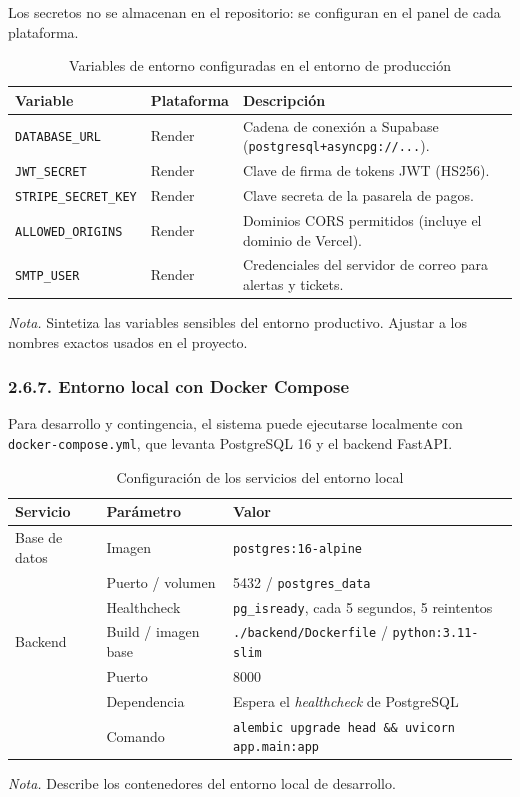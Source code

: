Los secretos no se almacenan en el repositorio: se configuran en el panel de cada plataforma.

\begin{table}[htbp]
\caption{Variables de entorno configuradas en el entorno de producción}
\label{tab:env_produccion}
\begin{tabular}{@{}p{5cm} p{2cm} p{8cm}@{}}
\toprule
\textbf{Variable} & \textbf{Plataforma} & \textbf{Descripción} \\
\midrule
\texttt{DATABASE\_URL} & Render & Cadena de conexión a Supabase (\texttt{postgresql+asyncpg://...}). \\
\texttt{JWT\_SECRET} & Render & Clave de firma de tokens JWT (HS256). \\
\texttt{STRIPE\_SECRET\_KEY} & Render & Clave secreta de la pasarela de pagos. \\
\texttt{ALLOWED\_ORIGINS} & Render & Dominios CORS permitidos (incluye el dominio de Vercel). \\
\texttt{SMTP\_USER} & Render & Credenciales del servidor de correo para alertas y tickets. \\
\bottomrule
\end{tabular}
\par\vspace{0.2cm}
\textit{Nota.} Sintetiza las variables sensibles del entorno productivo. Ajustar a los nombres exactos usados en el proyecto.
\end{table}

\subsubsection{2.6.7. Entorno local con Docker Compose}

Para desarrollo y contingencia, el sistema puede ejecutarse localmente con \texttt{docker-compose.yml}, que levanta PostgreSQL 16 y el backend FastAPI.

\begin{table}[htbp]
\caption{Configuración de los servicios del entorno local}
\label{tab:config_entorno_local}
\begin{tabular}{@{}p{3cm} p{3.5cm} p{8cm}@{}}
\toprule
\textbf{Servicio} & \textbf{Parámetro} & \textbf{Valor} \\
\midrule
Base de datos & Imagen & \texttt{postgres:16-alpine} \\
 & Puerto / volumen & 5432 / \texttt{postgres\_data} \\
 & Healthcheck & \texttt{pg\_isready}, cada 5 segundos, 5 reintentos \\
Backend & Build / imagen base & \texttt{./backend/Dockerfile} / \texttt{python:3.11-slim} \\
 & Puerto & 8000 \\
 & Dependencia & Espera el \textit{healthcheck} de PostgreSQL \\
 & Comando & \texttt{alembic upgrade head \&\& uvicorn app.main:app} \\
\bottomrule
\end{tabular}
\par\vspace{0.2cm}
\textit{Nota.} Describe los contenedores del entorno local de desarrollo.
\end{table}

